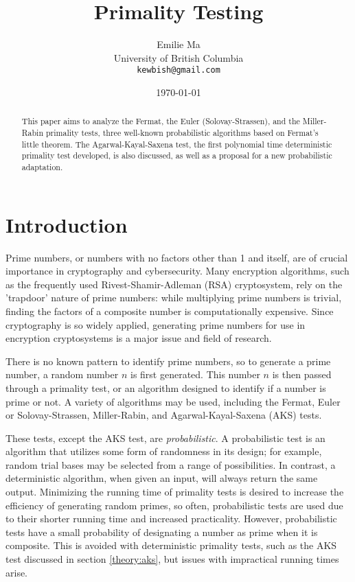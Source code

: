 \documentclass{article}
\title[Primality Testing]{Primality Testing}
\author[Emilie Ma]{%
Emilie Ma\\%
University of British Columbia\\%
\texttt{kewbish@gmail.com}%
}
\date{\today}
\begin{document}
\maketitle
\newpage
\begin{abstract}
    This paper aims to analyze the Fermat, the Euler (Solovay-Strassen), and the Miller-Rabin primality tests, three well-known probabilistic algorithms based on Fermat's little theorem. The Agarwal-Kayal-Saxena test, the first polynomial time deterministic primality test developed, is also discussed, as well as a proposal for a new probabilistic adaptation.
\end{abstract}

\section{Introduction}
Prime numbers, or numbers with no factors other than 1 and itself, are of crucial importance in cryptography and cybersecurity. Many encryption algorithms, such as the frequently used Rivest-Shamir-Adleman (RSA) cryptosystem, rely on the 'trapdoor' nature of prime numbers: while multiplying prime numbers is trivial, finding the factors of a composite number is computationally expensive. 
Since cryptography is so widely applied, generating prime numbers for use in encryption cryptosystems is a major issue and field of research.

There is no known pattern to identify prime numbers, so to generate a prime number, a random number $n$ is first generated. This number $n$ is then passed through a primality test, or an algorithm designed to identify if a number is prime or not. A variety of algorithms may be used, including the Fermat, Euler or Solovay-Strassen, Miller-Rabin, and Agarwal-Kayal-Saxena (AKS) tests.

These tests, except the AKS test, are \emph{probabilistic}. A probabilistic test is an algorithm that utilizes some form of randomness in its design; for example, random trial bases may be selected from a range of possibilities. In contrast, a deterministic algorithm, when given an input, will always return the same output. Minimizing the running time of primality tests is desired to increase the efficiency of generating random primes, so often, probabilistic tests are used due to their shorter running time and increased practicality. However, probabilistic tests have a small probability of designating a number as prime when it is composite. This is avoided with deterministic primality tests, such as the AKS test discussed in section \ref{theory:aks}, but issues with impractical running times arise.
\end{document}
